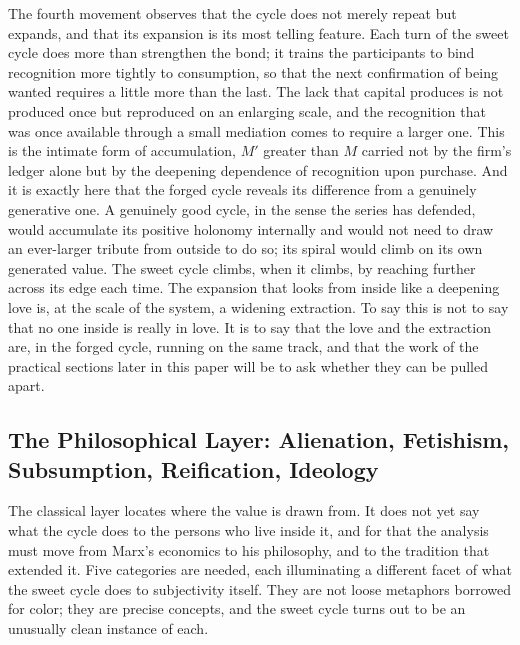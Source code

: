 The fourth movement observes that the cycle does not merely repeat but expands, and that its expansion is its most telling feature. Each turn of the sweet cycle does more than strengthen the bond; it trains the participants to bind recognition more tightly to consumption, so that the next confirmation of being wanted requires a little more than the last. The lack that capital produces is not produced once but reproduced on an enlarging scale, and the recognition that was once available through a small mediation comes to require a larger one. This is the intimate form of accumulation, $M'$ greater than $M$ carried not by the firm's ledger alone but by the deepening dependence of recognition upon purchase. And it is exactly here that the forged cycle reveals its difference from a genuinely generative one. A genuinely good cycle, in the sense the series has defended, would accumulate its positive holonomy internally and would not need to draw an ever-larger tribute from outside to do so; its spiral would climb on its own generated value. The sweet cycle climbs, when it climbs, by reaching further across its edge each time. The expansion that looks from inside like a deepening love is, at the scale of the system, a widening extraction. To say this is not to say that no one inside is really in love. It is to say that the love and the extraction are, in the forged cycle, running on the same track, and that the work of the practical sections later in this paper will be to ask whether they can be pulled apart.

\subsection{The Philosophical Layer: Alienation, Fetishism, Subsumption, Reification, Ideology}

The classical layer locates where the value is drawn from. It does not yet say what the cycle does to the persons who live inside it, and for that the analysis must move from Marx's economics to his philosophy, and to the tradition that extended it. Five categories are needed, each illuminating a different facet of what the sweet cycle does to subjectivity itself. They are not loose metaphors borrowed for color; they are precise concepts, and the sweet cycle turns out to be an unusually clean instance of each.

